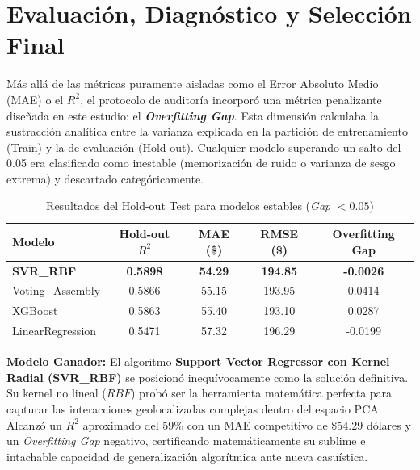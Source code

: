 \section{Evaluación, Diagnóstico y Selección Final}
Más allá de las métricas puramente aisladas como el Error Absoluto Medio (MAE) o el $R^2$, el protocolo de auditoría incorporó una métrica penalizante diseñada en este estudio: el \textbf{\textit{Overfitting Gap}}. Esta dimensión calculaba la sustracción analítica entre la varianza explicada en la partición de entrenamiento (Train) y la de evaluación (Hold-out). Cualquier modelo superando un salto del 0.05 era clasificado como inestable (memorización de ruido o varianza de sesgo extrema) y descartado categóricamente.

\begin{table}[H]
    \centering
    \caption{Resultados del Hold-out Test para modelos estables (\textit{Gap} $< 0.05$)}
    \begin{tabular}{lcccc}
        \toprule
        \textbf{Modelo} & \textbf{Hold-out $R^2$} & \textbf{MAE (\$)} & \textbf{RMSE (\$)} & \textbf{Overfitting Gap} \\
        \midrule
        \textbf{SVR\_RBF} & \textbf{0.5898} & \textbf{54.29} & \textbf{194.85} & \textbf{-0.0026} \\
        Voting\_Assembly & 0.5866 & 55.15 & 193.95 & 0.0414 \\
        XGBoost & 0.5863 & 55.40 & 193.10 & 0.0287 \\
        LinearRegression & 0.5471 & 57.32 & 196.29 & -0.0199 \\
        \bottomrule
    \end{tabular}
\end{table}

\textbf{Modelo Ganador:} El algoritmo \textbf{Support Vector Regressor con Kernel Radial (SVR\_RBF)} se posicionó inequívocamente como la solución definitiva. Su kernel no lineal ($RBF$) probó ser la herramienta matemática perfecta para capturar las interacciones geolocalizadas complejas dentro del espacio PCA. Alcanzó un $R^2$ aproximado del 59\% con un MAE competitivo de \$54.29 dólares y un \textit{Overfitting Gap} negativo, certificando matemáticamente su sublime e intachable capacidad de generalización algorítmica ante nueva casuística.
